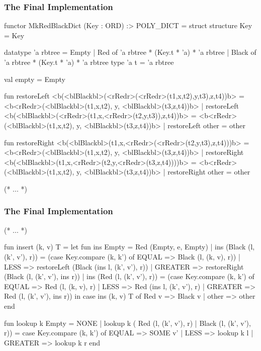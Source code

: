 \documentclass[aspectratio=169]{beamer}
\begin{document}
\begin{frame}[fragile]
  \frametitle{The Final Implementation}

  \tiny

  \begin{codeblock}
    functor MkRedBlackDict (Key : ORD) :> POLY_DICT =
      struct
        structure Key = Key

        datatype 'a rbtree =
            Empty
          | Red of 'a rbtree * (Key.t * 'a) * 'a rbtree
          | Black of 'a rbtree * (Key.t * 'a) * 'a rbtree
        type 'a t = 'a rbtree

        val empty = Empty

        fun restoreLeft <b(<blBlackbl>(<rRedr>(<rRedr>(t1,x,t2),y,t3),z,t4))b> =
              <b<rRedr>(<blBlackbl>(t1,x,t2), y, <blBlackbl>(t3,z,t4))b>
          | restoreLeft <b(<blBlackbl>(<rRedr>(t1,x,<rRedr>(t2,y,t3)),z,t4))b> =
              <b<rRedr>(<blBlackbl>(t1,x,t2), y, <blBlackbl>(t3,z,t4))b>
          | restoreLeft other = other

        fun restoreRight <b(<blBlackbl>(t1,x,<rRedr>(<rRedr>(t2,y,t3),z,t4)))b> =
              <b<rRedr>(<blBlackbl>(t1,x,t2), y, <blBlackbl>(t3,z,t4))b>
          | restoreRight <b(<blBlackbl>(t1,x,<rRedr>(t2,y,<rRedr>(t3,z,t4))))b> =
              <b<rRedr>(<blBlackbl>(t1,x,t2), y, <blBlackbl>(t3,z,t4))b>
          | restoreRight other = other

        (* ... *)
  \end{codeblock}
\end{frame}

\begin{frame}[fragile]
  \frametitle{The Final Implementation}

  \tiny
  \begin{codeblock}
    (* ... *)

        fun insert (k, v) T =
          let
            fun ins Empty = Red (Empty, e, Empty)
              | ins (Black (l, (k', v'), r)) =
                  (case Key.compare (k, k') of
                    EQUAL   => Black (l, (k, v), r))
                  | LESS    => restoreLeft (Black (ins l, (k', v'), r))
                  | GREATER => restoreRight (Black (l, (k', v'), ins r))
              | ins (Red (l, (k', v'), r)) =
                  (case Key.compare (k, k') of
                    EQUAL   => Red (l, (k, v), r)
                  | LESS    => Red (ins l, (k', v'), r)
                  | GREATER => Red (l, (k', v'), ins r))
          in
            case ins (k, v) T of
              Red v => Black v
            | other => other
          end

        fun lookup k Empty = NONE
          | lookup k ( Red (l, (k', v'), r)
                     | Black (l, (k', v'), r)) =
              case Key.compare (k, k') of
                EQUAL   => SOME v'
              | LESS    => lookup k l
              | GREATER => lookup k r
      end
  \end{codeblock}
\end{frame}
\end{document}
